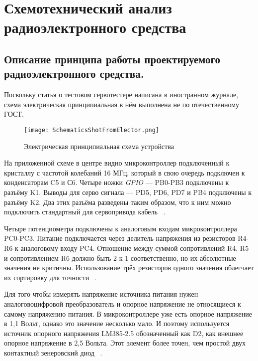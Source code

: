 \section{Схемотехнический анализ радиоэлектронного средства}


\subsection{Описание принципа работы
  проектируемого радиоэлектронного средства.}

Поскольку статья о тестовом сервотестере написана в иностранном
журнале, схема электрическая принципиальная в нём выполнена не по
отечественному ГОСТ.

\begin{figure}[H]
  \centering
  \texttt{[image: SchematicsShotFromElector.png]}
  \caption{Электрическая принципиальная схема устройства}
\end{figure}

На приложенной схеме в центре видно микроконтроллер подключенный к
кристаллу с частотой колебаний 16 МГц, который в свою очередь
подключен к конденсаторам C5 и С6. Четыре ножки \textit{GPIO} — PB0-PB3
подключены к разъёму K1. Выводы для серво сигнала — PD5, PD6, PD7 и
PB4 подключены к разъёму K2. Два этих разъёма разведены таким
образом, что к ним можно подключить стандартный для сервопривода
кабель ~\cite{Elector521}.

Четыре потенциометра подключены к аналоговым входам микроконтроллера
PC0-PC3. Питание подключается через делитель напряжения из резисторов
R4-R6 к аналоговому входу PC4. Отношение между суммой сопротивлений
R4, R5 и сопротивлением R6 должно быть 2 к 1 соответственно, но их
абсолютные значения не критичны. Использование трёх резисторов одного
значения облегчает их сортировку для точности ~\cite{Elector521}.

Для того чтобы измерять напряжение источника питания нужен
аналоговоцифровой преобразователь и опорное напряжение не относящиеся
к самому напряжению питания.  В микроконтроллере уже есть опорное
напряжение в 1,1 Вольт, однако это значение несколько мало. И поэтому
используется источник опорного напряжения LM385-2.5 обозначенный как
D2, как внешнее опорное напряжение в 2,5 Вольта. Этот элемент более
точен, чем простой двух контактный зенеровский диод
~\cite{Elector521}.

